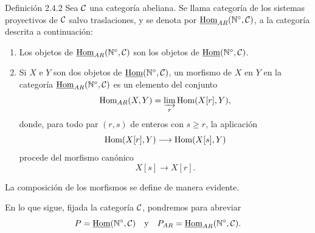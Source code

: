 \begin{statement}{Definición 2.4.2}
Sea $\mathcal C$ una categoría abeliana. Se llama categoría de los sistemas proyectivos de $\mathcal C$ salvo traslaciones, y se denota por $\underline{\operatorname{Hom}}_{AR}(\mathbb N^\circ,\mathcal C)$, a la categoría descrita a continuación:
\begin{enumerate}[label=(\roman*)]
\item Los objetos de $\underline{\operatorname{Hom}}_{AR}(\mathbb N^\circ,\mathcal C)$ son los objetos de $\underline{\operatorname{Hom}}(\mathbb N^\circ,\mathcal C)$.
\item Si $X$ e $Y$ son dos objetos de $\underline{\operatorname{Hom}}(\mathbb N^\circ,\mathcal C)$, un morfismo de $X$ en $Y$ en la categoría $\underline{\operatorname{Hom}}_{AR}(\mathbb N^\circ,\mathcal C)$ es un elemento del conjunto
\[
\operatorname{Hom}_{AR}(X,Y)=\varinjlim_r\operatorname{Hom}(X[r],Y),
\]
donde, para todo par $(r,s)$ de enteros con $s\ge r$, la aplicación
\[
\operatorname{Hom}(X[r],Y)\longrightarrow\operatorname{Hom}(X[s],Y)
\]
procede del morfismo canónico
\[
X[s]\longrightarrow X[r].
\]
\end{enumerate}
La composición de los morfismos se define de manera evidente.
\end{statement}
En lo que sigue, fijada la categoría $\mathcal C$, pondremos para abreviar
\[
P=\underline{\operatorname{Hom}}(\mathbb N^\circ,\mathcal C)\quad\text{y}\quad P_{AR}=\underline{\operatorname{Hom}}_{AR}(\mathbb N^\circ,\mathcal C).
\]
